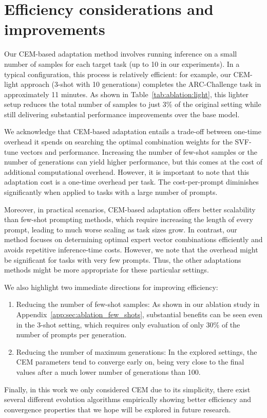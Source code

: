 
\section{Efficiency considerations and improvements}
\label{app:sec:efficiency_improvements}



Our CEM-based adaptation method involves running inference on a small number of samples for each target task (up to 10 in our experiments).
In a typical configuration, this process is relatively efficient: for example, our CEM-light approach (3-shot with 10 generations) completes the ARC-Challenge task in approximately 11 minutes.
As shown in Table~\ref{tab:ablation:light}, this lighter setup reduces the total number of samples to just 3\% of the original setting while still delivering substantial performance improvements over the base model.

We acknowledge that CEM-based adaptation entails a trade-off between one-time overhead it spends on searching the optimal combination weights for the SVF-tune vectors and performance.
Increasing the number of few-shot samples or the number of generations can yield higher performance, but this comes at the cost of additional computational overhead.
However, it is important to note that this adaptation cost is a one-time overhead per task.
The cost-per-prompt diminishes significantly when applied to tasks with a large number of prompts.

Moreover, in practical scenarios, CEM-based adaptation offers better scalability than few-shot prompting methods, which require increasing the length of every prompt, leading to much worse scaling as task sizes grow. In contrast, our method focuses on determining optimal expert vector combinations efficiently and avoids repetitive inference-time costs. However, we note that the overhead might be significant for tasks with very few prompts. Thus, the other adaptations methods might be more appropriate for these particular settings.

We also highlight two immediate directions for improving efficiency:
\begin{enumerate}
\item Reducing the number of few-shot samples: As shown in our ablation study in Appendix~\ref{app:sec:ablation_few_shots}, substantial benefits can be seen even in the 3-shot setting, which requires only evaluation of only 30\% of the number of prompts per generation.
\item Reducing the number of maximum generations: In the explored settings, the CEM parameters tend to converge early on, being very close to the final values after a much lower number of generations than 100.
\end{enumerate}

Finally, in this work we only considered CEM due to its simplicity, there exist several different evolution algorithms empirically showing better efficiency and convergence properties that we hope will be explored in future research.
